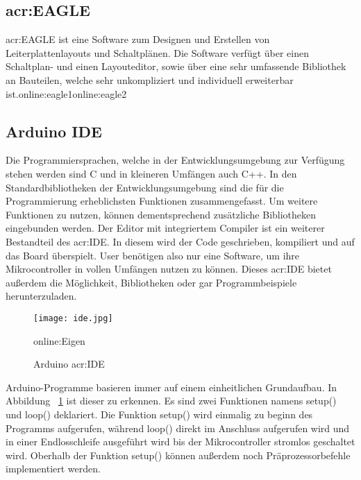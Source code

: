 \subsection{\gls{acr:EAGLE}}
\label{subsec:eagle}

\gls{acr:EAGLE} ist eine Software zum Designen und Erstellen von Leiterplattenlayouts und Schaltplänen. Die Software verfügt über einen Schaltplan- und einen Layouteditor, sowie über eine sehr umfassende Bibliothek an Bauteilen, welche sehr unkompliziert und individuell erweiterbar ist.\gls{online:eagle1}\gls{online:eagle2}

\subsection{Arduino IDE}
\label{subsec:ide}

Die Programmiersprachen, welche in der Entwicklungsumgebung zur Verfügung stehen werden sind C und in kleineren Umfängen auch C++. In den Standardbibliotheken der Entwicklungsumgebung sind die für die Programmierung erheblichsten Funktionen zusammengefasst. Um weitere Funktionen zu nutzen, können dementsprechend zusätzliche Bibliotheken eingebunden werden. 
Der Editor mit integriertem Compiler ist ein weiterer Bestandteil des \gls{acr:IDE}. In diesem wird der Code geschrieben, kompiliert und auf das Board überspielt. User benötigen also nur eine Software, um ihre Mikrocontroller in vollen Umfängen nutzen zu können. Dieses \gls{acr:IDE} bietet außerdem die Möglichkeit, Bibliotheken oder gar Programmbeispiele herunterzuladen.\cite{arduino}

\begin{figure}[H]
	\centering
	\texttt{[image: ide.jpg]}
	\caption[Arduino \gls{acr:IDE}]{Arduino \gls{acr:IDE}}\gls{online:Eigen}
	\label{fig:ide}
\end{figure}

Arduino-Programme basieren immer auf einem einheitlichen Grundaufbau. In Abbildung ~\ref{fig:ide} ist dieser zu erkennen. Es sind zwei Funktionen namens setup() und loop() deklariert. Die Funktion setup() wird einmalig zu beginn des Programms aufgerufen, während loop() direkt im Anschluss aufgerufen wird und in einer Endlosschleife ausgeführt wird bis der Mikrocontroller stromlos geschaltet wird. Oberhalb der Funktion setup() können außerdem noch Präprozessorbefehle implementiert werden.

